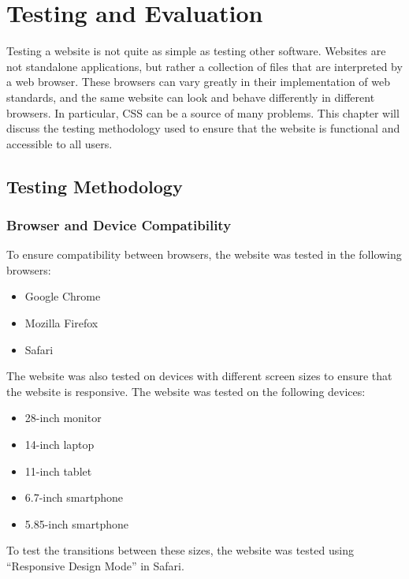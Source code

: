 \documentclass[../main.tex]{subfiles}
\begin{document}
\chapter{Testing and Evaluation} \label{ch:evaluation}
    Testing a website is not quite as simple as testing other software.
    Websites are not standalone applications, but rather a collection of files that
        are interpreted by a web browser.
    These browsers can vary greatly in their implementation of web standards, and
        the same website can look and behave differently in different browsers.
    In particular, CSS can be a source of many problems.
    This chapter will discuss the testing methodology used to ensure that the
        website is functional and accessible to all users.

    \section{Testing Methodology}
        \subsection{Browser and Device Compatibility}
            To ensure compatibility between browsers, the website was tested in the
            following browsers:
            \begin{itemize}
                \item Google Chrome
                \item Mozilla Firefox
                \item Safari
            \end{itemize}
            The website was also tested on devices with different screen sizes to ensure
                that the website is responsive.
            The website was tested on the following devices:
            \begin{itemize}
                \item 28-inch monitor
                \item 14-inch laptop
                \item 11-inch tablet
                \item 6.7-inch smartphone
                \item 5.85-inch smartphone
            \end{itemize}
            To test the transitions between these sizes, the website was tested using
                ``Responsive Design Mode'' in Safari.
\end{document}
